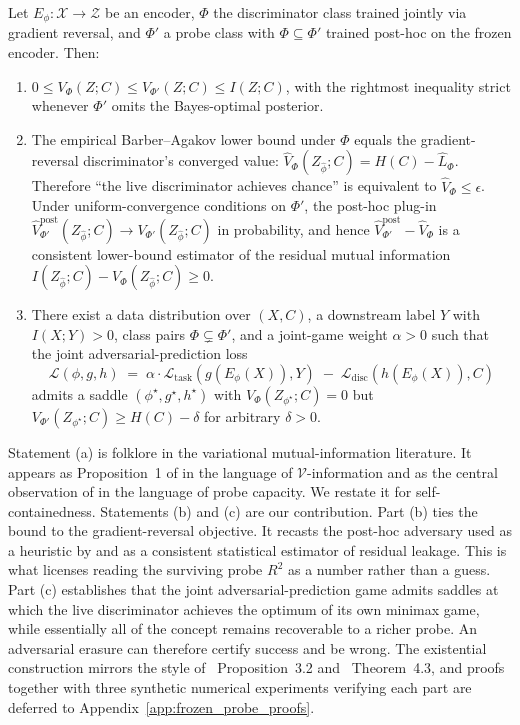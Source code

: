 \begin{proposition}
\label{prop:frozen_probe}
Let $E_\phi: \mathcal{X} \to \mathcal{Z}$ be an encoder, $\Phi$ the discriminator class trained jointly via gradient reversal, and $\Phi'$ a probe class with $\Phi \subseteq \Phi'$ trained post-hoc on the frozen encoder. Then:
\begin{enumerate}
\item[(a)] $0 \le V_\Phi(Z; C) \le V_{\Phi'}(Z; C) \le I(Z; C)$, with the rightmost inequality strict whenever $\Phi'$ omits the Bayes-optimal posterior.
\item[(b)] The empirical Barber--Agakov lower bound under $\Phi$ equals the gradient-reversal discriminator's converged value: $\hat V_\Phi(Z_{\hat\phi}; C) = H(C) - \hat L_\Phi$. Therefore ``the live discriminator achieves chance'' is equivalent to $\hat V_\Phi \le \epsilon$. Under uniform-convergence conditions on $\Phi'$, the post-hoc plug-in $\hat V_{\Phi'}^{\text{post}}(Z_{\hat\phi}; C) \to V_{\Phi'}(Z_{\hat\phi}; C)$ in probability, and hence $\hat V_{\Phi'}^{\text{post}} - \hat V_\Phi$ is a consistent lower-bound estimator of the residual mutual information $I(Z_{\hat\phi}; C) - V_\Phi(Z_{\hat\phi}; C) \ge 0$.
\item[(c)] There exist a data distribution over $(X, C)$, a downstream label $Y$ with $I(X; Y) > 0$, class pairs $\Phi \subsetneq \Phi'$, and a joint-game weight $\alpha > 0$ such that the joint adversarial-prediction loss
$$\mathcal{L}(\phi, g, h) \;=\; \alpha \cdot \mathcal{L}_{\text{task}}(g(E_\phi(X)), Y) \;-\; \mathcal{L}_{\text{disc}}(h(E_\phi(X)), C)$$
admits a saddle $(\phi^\star, g^\star, h^\star)$ with $V_\Phi(Z_{\phi^\star}; C) = 0$ but $V_{\Phi'}(Z_{\phi^\star}; C) \ge H(C) - \delta$ for arbitrary $\delta > 0$.
\end{enumerate}
\end{proposition}

Statement (a) is folklore in the variational mutual-information literature. It appears as Proposition~1 of \citet{xu2020theory} in the language of $\mathcal{V}$-information and as the central observation of \citet{pimentel2020information} in the language of probe capacity. We restate it for self-containedness. Statements (b) and (c) are our contribution. Part (b) ties the bound to the gradient-reversal objective. It recasts the post-hoc adversary used as a heuristic by \citet{moyer2018invariant} and \citet{elazar2018adversarial} as a consistent statistical estimator of residual leakage. This is what licenses reading the surviving probe $R^2$ as a number rather than a guess. Part (c) establishes that the joint adversarial-prediction game admits saddles at which the live discriminator achieves the optimum of its own minimax game, while essentially all of the concept remains recoverable to a richer probe. An adversarial erasure can therefore certify success and be wrong. The existential construction mirrors the style of \citet{ravfogel2022linear}~Proposition~3.2 and \citet{belrose2023leace}~Theorem~4.3, and proofs together with three synthetic numerical experiments verifying each part are deferred to Appendix~\ref{app:frozen_probe_proofs}.

